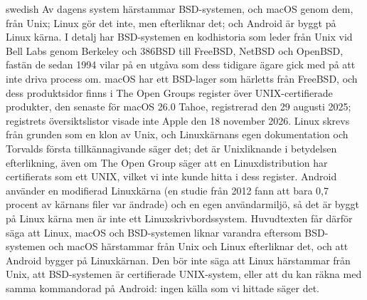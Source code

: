 \begin{onlyin}{swedish}
Av dagens system härstammar BSD-systemen, och macOS genom dem, från
Unix; Linux gör det inte, men efterliknar det; och Android är byggt på
Linux kärna.
I detalj har BSD-systemen en kodhistoria som leder från Unix vid Bell
Labs genom Berkeley och 386BSD till FreeBSD, NetBSD och OpenBSD, fastän
de sedan 1994 vilar på en utgåva som dess tidigare ägare gick med på att
inte driva process om.
macOS har ett BSD-lager som härletts från FreeBSD, och dess
produktsidor finns i The Open Groups register över UNIX-certifierade
produkter, den senaste för macOS 26.0 Tahoe, registrerad den 29 augusti
2025; registrets översiktslistor visade inte Apple den 18 november 2026.
Linux skrevs från grunden som en klon av Unix, och Linuxkärnans egen
dokumentation och Torvalds första tillkännagivande säger det; det är
Unixliknande i betydelsen efterlikning, även om The Open Group säger
att en Linuxdistribution har certifierats som ett UNIX, vilket vi inte
kunde hitta i dess register.
Android använder en modifierad Linuxkärna (en studie från 2012 fann att
bara 0,7 procent av kärnans filer var ändrade) och en egen
användarmiljö, så det är byggt på Linux kärna men är inte ett
Linuxskrivbordssystem.
Huvudtexten får därför säga att Linux, macOS och
BSD-systemen liknar varandra eftersom BSD-systemen och macOS härstammar
från Unix och Linux efterliknar det, och att Android bygger på
Linuxkärnan.
Den bör inte säga att Linux härstammar från Unix, att BSD-systemen är
certifierade UNIX-system, eller att du kan räkna med samma kommandorad
på Android: ingen källa som vi hittade säger det.
\end{onlyin}

\section{} %

